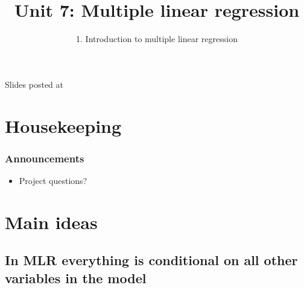 \documentclass[slidestop,compress,mathserif,12pt,t,professionalfonts,xcolor=table]{beamer}
\title{Unit 7: Multiple linear regression}
\subtitle{1. Introduction to multiple linear regression  }
\author{\CourseName}
\date{}
\institute{\InstituteName}
\begin{document}



\begin{frame}[plain]

\titlepage

\vfill

{\scriptsize {} \hfill Slides posted at  \webURL{\CourseSite}}

\addtocounter{framenumber}{-1} 

\end{frame}


\section{Housekeeping}


\begin{frame}
\frametitle{Announcements}

\begin{itemize}

\item Project questions?

\end{itemize}

\end{frame}


\section{Main ideas}


\subsection{In MLR everything is conditional on all other variables in the model}
\label{mi1}

\end{document}
